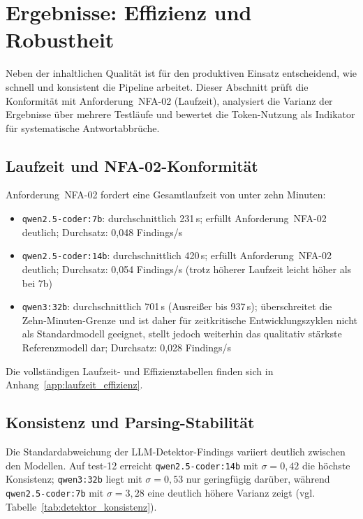 \section{Ergebnisse: Effizienz und Robustheit}
\label{sec:ergebnisse_effizienz}

Neben der inhaltlichen Qualität ist für den produktiven Einsatz entscheidend, wie schnell und konsistent die Pipeline arbeitet. Dieser Abschnitt prüft die Konformität mit Anforderung~\ac{NFA}-02 (Laufzeit), analysiert die Varianz der Ergebnisse über mehrere Testläufe und bewertet die Token-Nutzung als Indikator für systematische Antwortabbrüche.

\subsection{Laufzeit und \acs{NFA}-02-Konformität}
\label{sec:effizienz_laufzeit}

Anforderung~\ac{NFA}-02 fordert eine Gesamtlaufzeit von unter zehn Minuten:
\begin{itemize}
  \item \texttt{qwen2.5-coder:7b}: durchschnittlich 231\,s; erfüllt Anforderung~\ac{NFA}-02 deutlich; Durchsatz: 0{,}048 Findings/s
  \item \texttt{qwen2.5-coder:14b}: durchschnittlich 420\,s; erfüllt Anforderung~\ac{NFA}-02 deutlich; Durchsatz: 0{,}054 Findings/s (trotz höherer Laufzeit leicht höher als bei 7b)
  \item \texttt{qwen3:32b}: durchschnittlich 701\,s (Ausreißer bis 937\,s); überschreitet die Zehn-Minuten-Grenze und ist daher für zeitkritische Entwicklungszyklen nicht als Standardmodell geeignet, stellt jedoch weiterhin das qualitativ stärkste Referenzmodell dar; Durchsatz: 0{,}028 Findings/s
\end{itemize}
Die vollständigen Laufzeit- und Effizienztabellen finden sich in Anhang~\ref{app:laufzeit_effizienz}.

\subsection{Konsistenz und Parsing-Stabilität}
\label{sec:effizienz_konsistenz}

Die Standardabweichung der \ac{LLM}-Detektor-Findings variiert deutlich zwischen den Modellen. Auf test-12 erreicht \texttt{qwen2.5-coder:14b} mit $\sigma = 0{,}42$ die höchste Konsistenz; \texttt{qwen3:32b} liegt mit $\sigma = 0{,}53$ nur geringfügig darüber, während \texttt{qwen2.5-coder:7b} mit $\sigma = 3{,}28$ eine deutlich höhere Varianz zeigt (vgl. Tabelle~\ref{tab:detektor_konsistenz}).

